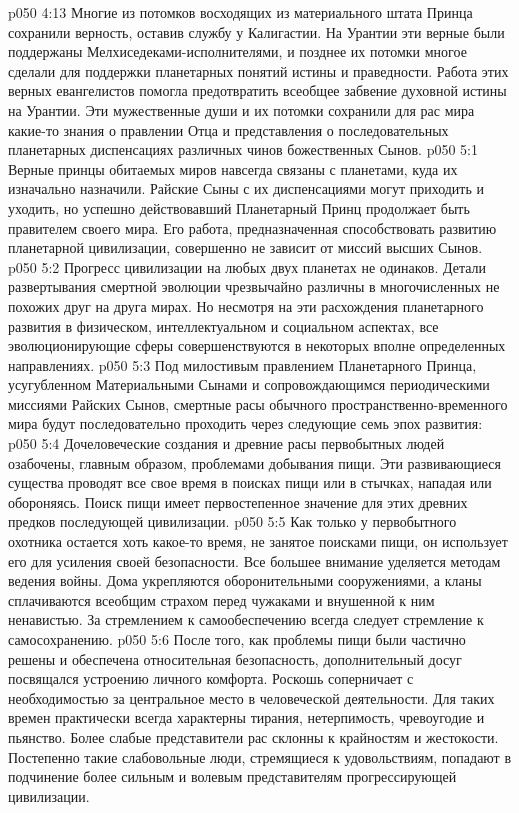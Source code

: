 \vs p050 4:13 Многие из потомков восходящих из материального штата Принца сохранили верность, оставив службу у Калигастии. На Урантии эти верные были поддержаны Мелхиседеками\hyp{}исполнителями, и позднее их потомки многое сделали для поддержки планетарных понятий истины и праведности. Работа этих верных евангелистов помогла предотвратить всеобщее забвение духовной истины на Урантии. Эти мужественные души и их потомки сохранили для рас мира какие\hyp{}то знания о правлении Отца и представления о последовательных планетарных диспенсациях различных чинов божественных Сынов.
\vs p050 5:1 Верные принцы обитаемых миров навсегда связаны с планетами, куда их изначально назначили. Райские Сыны с их диспенсациями могут приходить и уходить, но успешно действовавший Планетарный Принц продолжает быть правителем своего мира. Его работа, предназначенная способствовать развитию планетарной цивилизации, совершенно не зависит от миссий высших Сынов.
\vs p050 5:2 Прогресс цивилизации на любых двух планетах не одинаков. Детали развертывания смертной эволюции чрезвычайно различны в многочисленных не похожих друг на друга мирах. Но несмотря на эти расхождения планетарного развития в физическом, интеллектуальном и социальном аспектах, все эволюционирующие сферы совершенствуются в некоторых вполне определенных направлениях.
\vs p050 5:3 Под милостивым правлением Планетарного Принца, усугубленном Материальными Сынами и сопровождающимся периодическими миссиями Райских Сынов, смертные расы обычного пространственно\hyp{}временного мира будут последовательно проходить через следующие семь эпох развития:
\vs p050 5:4 \bibnobreakspace {} Дочеловеческие создания и древние расы первобытных людей озабочены, главным образом, проблемами добывания пищи. Эти развивающиеся существа проводят все свое время в поисках пищи или в стычках, нападая или обороняясь. Поиск пищи имеет первостепенное значение для этих древних предков последующей цивилизации.
\vs p050 5:5 \pc {}\bibnobreakspace {} Как только у первобытного охотника остается хоть какое\hyp{}то время, не занятое поисками пищи, он использует его для усиления своей безопасности. Все большее внимание уделяется методам ведения войны. Дома укрепляются оборонительными сооружениями, а кланы сплачиваются всеобщим страхом перед чужаками и внушенной к ним ненавистью. За стремлением к самообеспечению всегда следует стремление к самосохранению.
\vs p050 5:6 \pc {}\bibnobreakspace {} После того, как проблемы пищи были частично решены и обеспечена относительная безопасность, дополнительный досуг посвящался устроению личного комфорта. Роскошь соперничает с необходимостью за центральное место в человеческой деятельности. Для таких времен практически всегда характерны тирания, нетерпимость, чревоугодие и пьянство. Более слабые представители рас склонны к крайностям и жестокости. Постепенно такие слабовольные люди, стремящиеся к удовольствиям, попадают в подчинение более сильным и волевым представителям прогрессирующей цивилизации.
